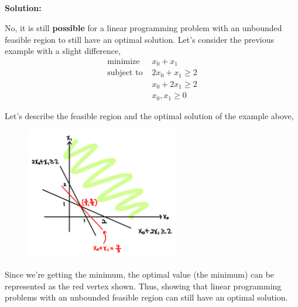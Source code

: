 \documentclass[11pt]{article}
\newenvironment{solution}
  {\par\noindent\textbf{Solution:}\par}
  {\par}
\begin{document}
\subsection{}
\begin{solution}
  No, it is still \textbf{possible} for a linear programming problem with an unbounded 
  feasible region to still have an optimal solution. Let's consider the previous example with a slight difference,
\[
    \begin{aligned}
      \text{minimize } &x_0 + x_1 \\ 
      \text{subject to } &2x_0 + x_1 \ge 2 \\ 
                        &x_0 +2x_1 \ge 2 \\ 
                        &x_0,x_1 \ge 0
    \end{aligned}
  \]

  Let's describe the feasible region and the optimal solution of the example above,
  \begin{figure}[H]
\centering
\includegraphics[width=0.6\textwidth]{figure2.png} 
\end{figure}
Since we're getting the minimum, the optimal value (the minimum) can be represented as the red vertex shown. Thus, showing that linear programming problems with an unbounded feasible region can still have an optimal solution.


\end{solution}
\pagebreak
\end{document}
